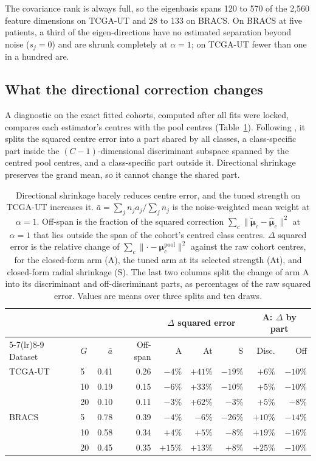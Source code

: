 \noindent The covariance rank is always full, so the eigenbasis spans 120 to 570 of the 2,560 feature dimensions on TCGA-UT and 28 to 133 on BRACS. On BRACS at five patients, a third of the eigen-directions have no estimated separation beyond noise ($s_j=0$) and are shrunk completely at $\alpha=1$; on TCGA-UT fewer than one in a hundred are.

\subsection{What the directional correction changes}
\label{sec:geometry-results}
A diagnostic on the exact fitted cohorts, computed after all fits were locked, compares each estimator's centres with the pool centres (Table~\ref{tab:geometry}). Following \citet{queisler2026centreError}, it splits the squared centre error into a part shared by all classes, a class-specific part inside the $(C-1)$-dimensional discriminant subspace spanned by the centred pool centres, and a class-specific part outside it. Directional shrinkage preserves the grand mean, so it cannot change the shared part.

\begin{table}[htbp]
\centering
\small
\renewcommand{\arraystretch}{1.15}
\begin{tabular}{@{}llrrrrrrr@{}}
\toprule
 & & & & \multicolumn{3}{c}{$\Delta$ squared error} & \multicolumn{2}{c}{A: $\Delta$ by part} \\
\cmidrule(lr){5-7}\cmidrule(lr){8-9}
Dataset & $G$ & $\bar a$ & Off-span & A & At & S & Disc. & Off \\
\midrule
TCGA-UT & 5 & 0.41 & 0.26 & $-4\%$ & $+41\%$ & $-19\%$ & $+6\%$ & $-10\%$ \\
        & 10 & 0.19 & 0.15 & $-6\%$ & $+33\%$ & $-10\%$ & $+5\%$ & $-10\%$ \\
        & 20 & 0.10 & 0.11 & $-3\%$ & $+62\%$ & $-3\%$ & $+5\%$ & $-8\%$ \\
\addlinespace
BRACS & 5 & 0.78 & 0.39 & $-4\%$ & $-6\%$ & $-26\%$ & $+10\%$ & $-14\%$ \\
      & 10 & 0.58 & 0.34 & $+4\%$ & $+5\%$ & $-8\%$ & $+19\%$ & $-16\%$ \\
      & 20 & 0.45 & 0.35 & $+15\%$ & $+13\%$ & $+8\%$ & $+25\%$ & $-10\%$ \\
\bottomrule
\end{tabular}
\caption{Directional shrinkage barely reduces centre error, and the tuned strength on TCGA-UT increases it. $\bar a=\sum_j n_ja_j/\sum_j n_j$ is the noise-weighted mean weight at $\alpha=1$. Off-span is the fraction of the squared correction $\sum_c\lVert\tilde{\boldsymbol\mu}_c-\hat{\boldsymbol\mu}_c\rVert^2$ at $\alpha=1$ that lies outside the span of the cohort's centred class centres. $\Delta$ squared error is the relative change of $\sum_c\lVert\cdot-\boldsymbol\mu_c^{\mathrm{pool}}\rVert^2$ against the raw cohort centres, for the closed-form arm (A), the tuned arm at its selected strength (At), and closed-form radial shrinkage (S). The last two columns split the change of arm A into its discriminant and off-discriminant parts, as percentages of the raw squared error. Values are means over three splits and ten draws.}
\label{tab:geometry}
\end{table}

